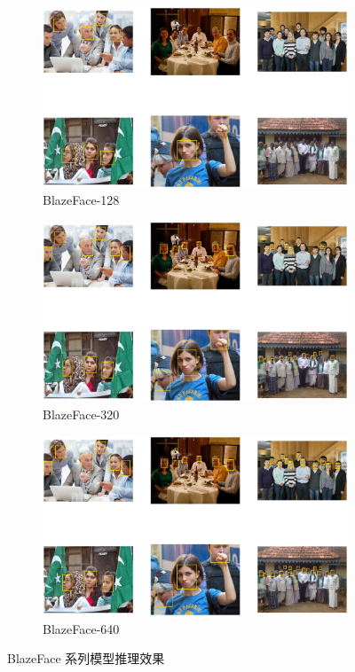 \documentclass{article}
\begin{document}
\begin{figure}[htbp]
    \centering
    \begin{subfigure}[b]{0.32\textwidth}
        \includegraphics[width=\textwidth]{imgs/infer_result/blazeface_128.jpg}
        \caption{BlazeFace-128}
    \end{subfigure}
    \hfill
    \begin{subfigure}[b]{0.32\textwidth}
        \includegraphics[width=\textwidth]{imgs/infer_result/blazeface_320.jpg}
        \caption{BlazeFace-320}
    \end{subfigure}
    \hfill
    \begin{subfigure}[b]{0.32\textwidth}
        \includegraphics[width=\textwidth]{imgs/infer_result/blazeface_640.jpg}
        \caption{BlazeFace-640}
    \end{subfigure}
    \caption{BlazeFace 系列模型推理效果}
    \label{fig:infer_blazeface}
\end{figure}
\end{document}
